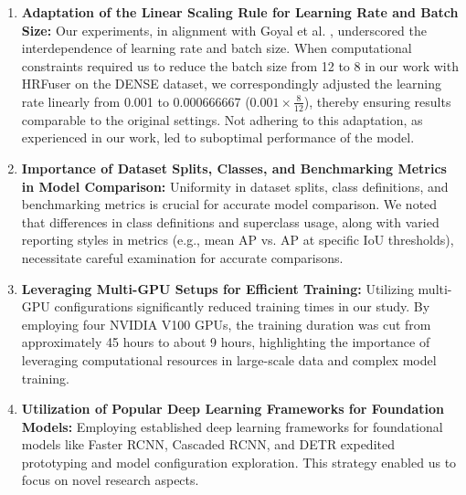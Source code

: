 \documentclass[report.tex]{subfiles}
\begin{document}


    \begin{enumerate}

        \item \textbf{Adaptation of the Linear Scaling Rule for Learning Rate and Batch Size:} 
        Our experiments, in alignment with Goyal et al. \cite{goyal2017accurate}, underscored the interdependence of learning rate and batch size. When computational constraints required us to reduce the batch size from 12 to 8 in our work with HRFuser on the DENSE dataset, we correspondingly adjusted the learning rate linearly from 0.001 to 0.000666667 (\(0.001 \times \frac{8}{12}\)), thereby ensuring results comparable to the original settings. Not adhering to this adaptation, as experienced in our work, led to suboptimal performance of the model.

        \item \textbf{Importance of Dataset Splits, Classes, and Benchmarking Metrics in Model Comparison:} 
        Uniformity in dataset splits, class definitions, and benchmarking metrics is crucial for accurate model comparison. We noted that differences in class definitions and superclass usage, along with varied reporting styles in metrics (e.g., mean AP vs. AP at specific IoU thresholds), necessitate careful examination for accurate comparisons.

        \item \textbf{Leveraging Multi-GPU Setups for Efficient Training:} 
        Utilizing multi-GPU configurations significantly reduced training times in our study. By employing four NVIDIA V100 GPUs, the training duration was cut from approximately 45 hours to about 9 hours, highlighting the importance of leveraging computational resources in large-scale data and complex model training.

        \item \textbf{Utilization of Popular Deep Learning Frameworks for Foundation Models:} 
        Employing established deep learning frameworks for foundational models like Faster RCNN, Cascaded RCNN, and DETR expedited prototyping and model configuration exploration. This strategy enabled us to focus on novel research aspects.
    \end{enumerate}
\end{document}

